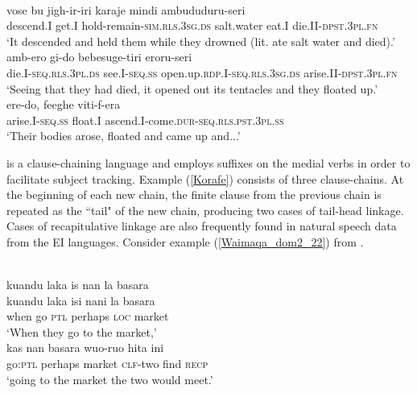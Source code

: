 \ea \label{Korafe}
\\
\ea
\gll vose bu jigh-ir-iri karaje mindi ambududuru-seri \\
descend.I get.I hold-remain-\textsc{sim}.\textsc{rls}.3\textsc{sg}.\textsc{ds} salt.water eat.I die.II-\textsc{dpst}.3\textsc{pl}.\textsc{fn} \\
\glft `It descended and held them while they drowned (lit. ate salt water and died).' \\
\ex
\gll amb-ero gi-do bebesuge-tiri eroru-seri \\
die.I-\textsc{seq}.\textsc{rls}.3\textsc{pl}.\textsc{ds} see.I-\textsc{seq}.\textsc{ss} open.up.\textsc{rdp}.I-\textsc{seq}.\textsc{rls}.3\textsc{sg}.\textsc{ds} arise.II-\textsc{dpst}.3\textsc{pl}.\textsc{fn} \\
\glft `Seeing that they had died, it opened out its tentacles and they floated up.' \\
\ex
\gll ere-do, feeghe viti-f-era \\
arise.I-\textsc{seq}.\textsc{ss} float.I ascend.I-come.\textsc{dur}-\textsc{seq}.\textsc{rls}.\textsc{pst}.3\textsc{pl}.\textsc{ss} \\
\glft `Their bodies arose, floated and came up and...' \\
\z
\z

 is a clause-chaining language and employs suffixes on the medial verbs in order to facilitate subject tracking. Example (\ref{Korafe}) consists of three clause-chains. At the beginning of each new chain, the finite clause from the previous chain is repeated as the ``tail" of the new chain, producing two cases of tail-head linkage. Cases of recapitulative linkage are also frequently found in natural speech data from the EI languages. Consider example (\ref{Waimaqa_dom2_22}) from .

\ea \label{Waimaqa_dom2_22}
\\
\ea
\glll kuandu laka is nan la basara \\
kuandu laka isi nani la basara \\
when go \textsc{ptl} perhaps \textsc{loc} market \\
\glft `When they go to the market,' \\
\ex
\gll kas nan basara wuo-ruo hita ini \\
go:\textsc{ptl} perhaps market \textsc{clf}-two find \textsc{recp} \\
\glft `going to the market the two would meet.'\\
\z
\z

